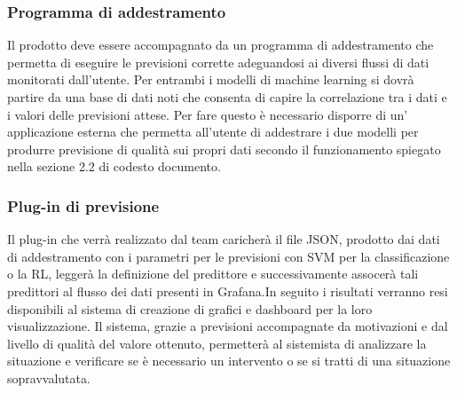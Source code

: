 \documentclass[../analisi-dei-requisiti.tex]{subfiles}
\begin{document}
	\subsubsection{Programma di addestramento}
	\label{sssec:programma_di_addestramento}
		Il prodotto deve essere accompagnato da un programma di addestramento che permetta di eseguire le previsioni corrette adeguandosi ai diversi flussi di dati monitorati dall'utente. Per entrambi i modelli di machine learning si dovrà partire da una base di dati noti che consenta di capire la correlazione tra i dati e i valori delle previsioni attese. Per fare questo è necessario disporre di un' applicazione esterna che permetta all'utente di addestrare i due modelli per produrre previsione di qualità sui propri dati secondo il funzionamento spiegato nella sezione 2.2 di codesto documento.

	\subsubsection{Plug-in di previsione}
	\label{sssec:plug-in_di_previsione}
		Il plug-in che verrà realizzato dal team caricherà il file JSON, prodotto dai dati di addestramento con i parametri per le previsioni con SVM per la classificazione o la RL, leggerà la definizione del predittore e successivamente assocerà tali predittori al flusso dei dati presenti in Grafana.In seguito i risultati verranno resi disponibili al sistema di creazione di grafici e dashboard per la loro visualizzazione. Il sistema, grazie a previsioni accompagnate da motivazioni e dal livello di qualità del valore ottenuto, permetterà al sistemista di analizzare la situazione e verificare se è necessario un intervento o se si tratti di una situazione sopravvalutata.
\end{document}
